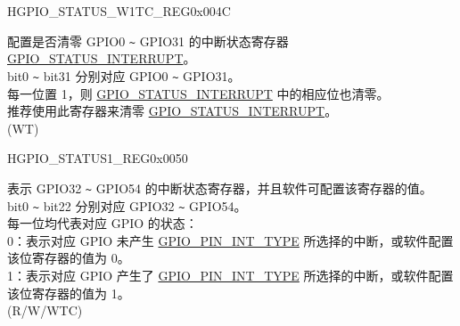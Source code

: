 \begin{register}{H}{GPIO\_STATUS\_W1TC\_REG}{0x004C}\label{regdesc:GPIOSTATUSW1TCREG}
%
\regnewline%
\begin{regdesc}\begin{reglist}
\label{fielddesc:GPIOSTATUSW1TC}\item [GPIO\_STATUS\_W1TC] 配置是否清零 GPIO0 \verb+~+ GPIO31 的中断状态寄存器  \hyperref[fielddesc:GPIOSTATUSINTERRUPT]{GPIO\_STATUS\_INTERRUPT}。\\
bit0 \verb+~+ bit31 分别对应 GPIO0 \verb+~+ GPIO31。\\
每一位置 1，则  \hyperref[fielddesc:GPIOSTATUSINTERRUPT]{GPIO\_STATUS\_INTERRUPT} 中的相应位也清零。\\
推荐使用此寄存器来清零 \hyperref[fielddesc:GPIOSTATUSINTERRUPT]{GPIO\_STATUS\_INTERRUPT}。\\
(WT)
\end{reglist}\end{regdesc}
\end{register}


\begin{register}{H}{GPIO\_STATUS1\_REG}{0x0050}\label{regdesc:GPIOSTATUS1REG}
%
%
\regnewline%
\begin{regdesc}\begin{reglist}
\label{fielddesc:GPIOSTATUS1INTERRUPT}\item [GPIO\_STATUS1\_INTERRUPT] 表示 GPIO32 \verb+~+ GPIO54 的中断状态寄存器，并且软件可配置该寄存器的值。\\
bit0 \verb+~+ bit22 分别对应 GPIO32 \verb+~+ GPIO54。 \\
每一位均代表对应 GPIO 的状态：\\
0：表示对应 GPIO 未产生  \hyperref[fielddesc:GPIOPINNINTTYPE]{GPIO\_PIN\_INT\_TYPE} 所选择的中断，或软件配置该位寄存器的值为 0。\\
1：表示对应 GPIO 产生了  \hyperref[fielddesc:GPIOPINNINTTYPE]{GPIO\_PIN\_INT\_TYPE} 所选择的中断，或软件配置该位寄存器的值为 1。\\
(R/W/WTC)
\end{reglist}\end{regdesc}
\end{register}


